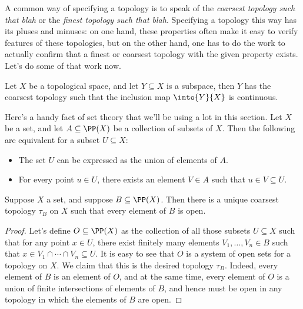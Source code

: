 
A common way of specifying a topology is to speak of the
\emph{coarsest topology such that blah} or the
\emph{finest topology such that blah}.
Specifying a topology this way has its pluses and minuses:
on one hand, these properties often make it easy to verify features of these topologies,
but on the other hand, one has to do the work to actually confirm that a finest or coarsest topology with the given property exists.
Let's do some of that work now.

\begin{exm}
	Let $X$ be a topological space, and let $Y\subseteq X$ is a subspace, then $Y$ has the coarsest topology such that the inclusion map $\into{Y}{X}$ is continuous.
\end{exm}

\begin{nul}
	Here's a handy fact of set theory that we'll be using a lot in this section.
	Let $X$ be a set, and let $A \subseteq \PP(X)$ be a collection of subsets of $X$.
	Then the following are equivalent for a subset $U \subseteq X$:
	\begin{itemize}
		\item The set $U$ can be expressed as the union of elements of $A$.
		\item For every point $u \in U$, there exists an element $V \in A $ such that $u \in V \subseteq U $.
	\end{itemize}
\end{nul}

\begin{prp}
	Suppose $X$ a set, and suppose $B\subseteq\PP(X)$.
	Then there is a unique coarsest topology $\tau_B$ on $X$ such that every element of $B$ is open.
\end{prp}

\begin{proof}
	Let's define $O\subseteq\PP(X)$ as the collection of all those subsets $U\subseteq X$ such that for any point $x\in U$,
	there exist finitely many elements $V_1,\dots,V_n\in B$ such that $x\in V_1\cap\cdots\cap V_n\subseteq U$.
	It is easy to see that $O$ is a system of open sets for a topology on $X$. We claim that this is the desired topology $\tau_B$.
	Indeed, every element of $B$ is an element of $O$, and
	at the same time, every element of $O$ is a union of finite intersections of elements of $B$, and
	hence must be open in any topology in which the elements of $B$ are open.
\end{proof}

